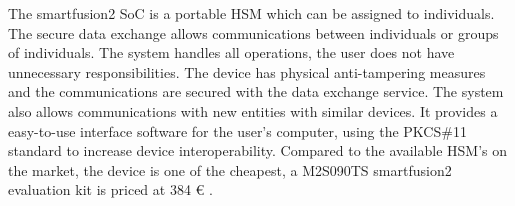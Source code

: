 The smartfusion2 SoC is a portable HSM which can be assigned to individuals.
The secure data exchange allows communications between individuals or groups of individuals.
The system handles all operations, the user does not have unnecessary responsibilities.
The device has physical anti-tampering measures and the communications are secured with the data exchange service.
The system also allows communications with new entities with similar devices.
It provides a easy-to-use interface software for the user's computer, using the PKCS\#11 standard to increase device interoperability.
Compared to the available HSM's on the market, the device is one of the cheapest, a M2S090TS smartfusion2 evaluation kit is priced at 384 € \cite{smartfusionPrice}.


